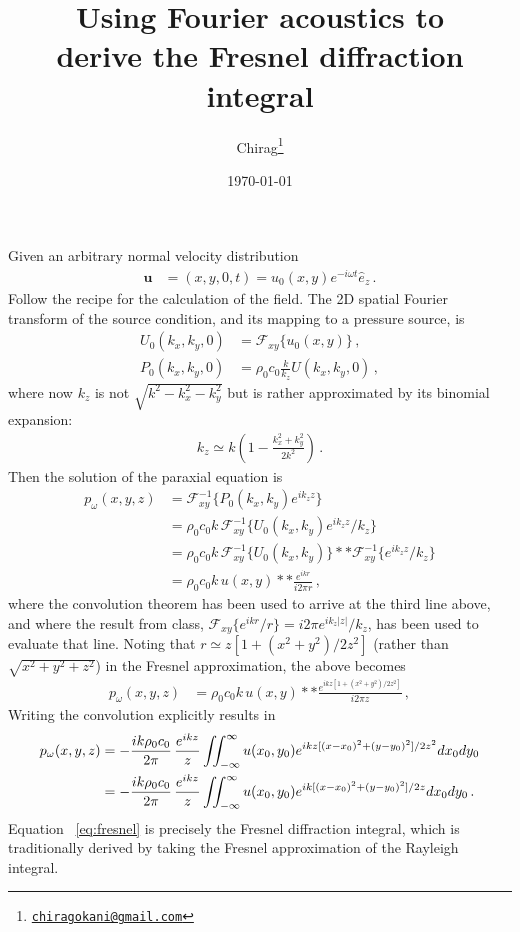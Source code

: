 \documentclass[12pt]{article}
\title{Using Fourier acoustics to \\derive the Fresnel diffraction integral}
\author{Chirag\footnote{\href{mailto:chiragokani@gmail.com}{\texttt{chiragokani@gmail.com}}}} %
\date{\today}
\renewcommand{\vec}[1]{\mathbf{#1}}
\newcommand{\FTxy}{\mathcal{F}_{xy}}
\newcommand{\IFTxy}{\mathcal{F}_{xy}^{-1}}
\newcommand{\ez}{\hat{e}_z}
\begin{document}
\maketitle
Given an arbitrary normal velocity distribution
\begin{align*}
\vec{u} &= (x,y,0,t) = u_0(x,y) e^{-i\omega t} \ez \,.
\end{align*} 
Follow the recipe for the calculation of the field. The 2D spatial Fourier transform of the source condition, and its mapping to a pressure source, is
\begin{align*}
U_0(k_x,k_y,0) &= \FTxy \{u_0(x,y)\}\,,\\
P_0(k_x,k_y,0) &= \rho_0c_0 \frac{k}{k_z} U(k_x,k_y,0)\,,
\end{align*}
where now \(k_z\) is not \(\sqrt{k^2 - k_x^2 - k_y^2}\) but is rather approximated by its binomial expansion:
\begin{align}\label{eq:kz}
k_z \simeq k \left(1 - \frac{k_x^2 + k_y^2}{2k^2}\right)\,.
\end{align}
Then the solution of the paraxial equation is 
\begin{align*}
p_\omega(x,y,z) &= \IFTxy\{P_0(k_x,k_y) e^{ik_zz}\}\\
&= \rho_0c_0 k\, \IFTxy \{U_0 (k_x,k_y) e^{ik_zz}/k_z\}\\
&= \rho_0c_0 k\, \IFTxy \{U_0 (k_x,k_y)\} ** \IFTxy\{ e^{ik_zz}/k_z\}\\
&= \rho_0c_0 k\, u(x,y) ** \frac{e^{ikr}}{i2\pi r}\,,
\end{align*}
where the convolution theorem has been used to arrive at the third line above, and where the result from class, \(\FTxy \{e^{ikr}/r\} = i2\pi e^{ik_z|z|}/k_z\), has been used to evaluate that line. Noting that \(r\simeq z[1 + (x^2+y^2)/2z^2]\) (rather than \(\sqrt{x^2 + y^2 + z^2}\)) in the Fresnel approximation, the above becomes
\begin{align*}
p_\omega(x,y,z) &= \rho_0c_0 k\, u(x,y) ** \frac{e^{ikz[1 + (x^2+y^2)/2z^2]}}{i2\pi z}\,,
\end{align*}
Writing the convolution explicitly results in 
\begin{align}
p_\omega(x,y,z) &= -\frac{ik\rho_0c_0 }{2\pi}\, \frac{e^{ikz}}{z} \iint_{-\infty}^\infty u(x_0,y_0) e^{ikz[(x-x_0)^2+(y-y_0)^2]/2z^2} dx_0dy_0\notag\\
&= {-\frac{ik\rho_0c_0 }{2\pi}\, \frac{e^{ikz}}{z} \iint_{-\infty}^\infty u(x_0,y_0) e^{ik[(x-x_0)^2+(y-y_0)^2]/2z} dx_0dy_0 \,.}\label{eq:fresnel}
\end{align}
Equation ~\eqref{eq:fresnel} is precisely the Fresnel diffraction integral, which is traditionally derived by taking the Fresnel approximation of the Rayleigh integral.


\printbibliography
\end{document}
